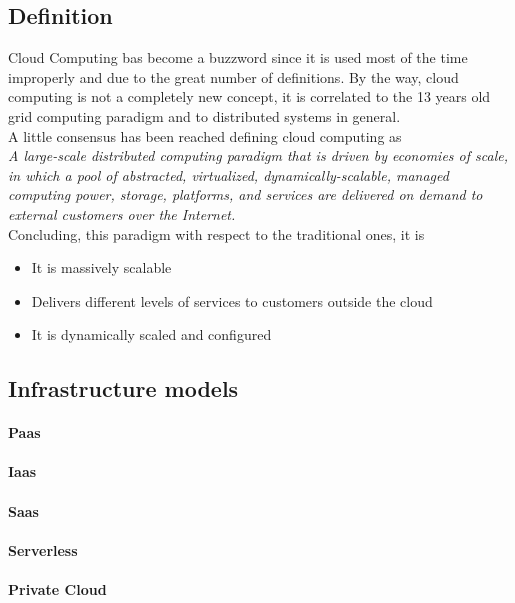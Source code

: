 \subsection{Definition}
Cloud Computing bas become a buzzword since it is used most of the time improperly and due to the great number of definitions. By the way, cloud computing is not a completely new concept, it is correlated to the 13 years old grid computing paradigm and to distributed systems in general.\cite{foster}\\
A little consensus has been reached defining cloud computing as\\
\textit{A large-scale distributed computing paradigm that is driven by economies of scale, in which a pool of abstracted, virtualized, dynamically-scalable, managed computing power, storage, platforms, and services are delivered on demand to external customers over the Internet.}\\
Concluding, this paradigm with respect to the traditional ones, it is
\begin{itemize}
    \item It is massively scalable
    \item Delivers different levels of services to customers outside the cloud
    \item It is dynamically scaled and configured
\end{itemize}
\cite{foster}

\subsection{Infrastructure models}
\paragraph{Paas}
\label{paragraph:Paas}
\paragraph{Iaas}
\label{paragraph:Iaas}
\paragraph{Saas}
\label{paragraph:Saas}
\paragraph{Serverless}
\label{paragraph:Serverless}
\paragraph{Private Cloud}
\label{paragraph:Private Cloud}
